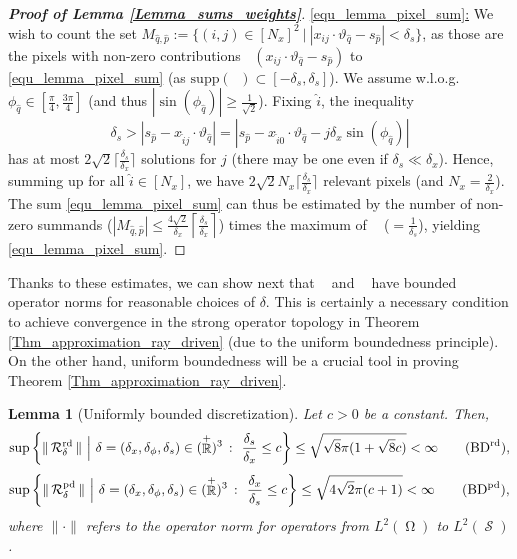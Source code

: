 \documentclass[11pt,reqno]{amsart}
\newcommand{\supp}[1]{\mathrm{supp}\left( #1 \right)}
\DeclareMathOperator{\RR}{\mathbb{R}}
\DeclareMathOperator{\RayRadon}{\mathcal{R}^\mathrm{rd}_{\delta}}
\DeclareMathOperator{\PixelRadon}{\mathcal{R}^\mathrm{pd}_{\delta}}
\DeclareMathOperator{\PixelWeight}{\omega^\mathrm{pd}_{\delta_\mathit{s}}}
\DeclareMathOperator{\imgdom}{\Omega}
\DeclareMathOperator{\sinodom}{\mathcal{S}}
\numberwithin{theorem}{section}
\newtheorem{lemma}[theorem]{Lemma}
\theoremstyle{remark}
\begin{document}
\begin{proof}[\textbf{Proof of Lemma \ref{Lemma_sums_weights}}]
\underline{\eqref{equ_lemma_pixel_sum}:} We wish to count the set $M_{\hat q, \hat p}:=\{(i,j)\in [N_x]^2 \ \big |\ |x_{ij}\cdot \vartheta_{\hat q}-s_{\hat p}|< \delta_s\}$, as those are the  pixels with non-zero contributions $\PixelWeight(x_{ij}\cdot \vartheta_{\hat q}-s_{\hat p})$ to \eqref{equ_lemma_pixel_sum} (as $\supp \PixelWeight \subset [-\delta_s,\delta_s]$).
We assume w.l.o.g. $\phi_{\hat q}\in \left[\frac{\pi}{4},\frac{3\pi}{4}\right]$ (and thus $|\sin(\phi_{\hat q})|\geq \frac {1}{\sqrt{2}}$). Fixing $\hat i$, the inequality 
\begin{equation}
 \delta_{s} > |s_{\hat p} -x_{\hat i j}\cdot \vartheta_{\hat q}|= |s_{\hat p}-x_{\hat i0}\cdot \vartheta_{\hat q}-j \delta_x \sin(\phi_{\hat q})|
 \end{equation}
  has at most $2\sqrt{2} \lceil\frac{\delta_s}{\delta_x}\rceil$ solutions for $j$ (there may be one even if $\delta_s \ll \delta_x$). Hence, summing up for all $\hat i\in [N_x]$, we have  $2\sqrt{2}N_x\lceil\frac{\delta_s}{\delta_x}\rceil$ relevant pixels (and $N_x=\frac{2}{\delta_x}$). The sum \eqref{equ_lemma_pixel_sum} can thus be estimated by the number of non-zero summands ($|M_{\hat q, \hat p}|\leq \frac{4\sqrt{2}}{\delta_x} \left\lceil\frac{\delta_s}{\delta_x}\right\rceil$) times the maximum of $\PixelWeight$ ($=\frac{1}{\delta_s}$), yielding \eqref{equ_lemma_pixel_sum}.
\end{proof}


Thanks to these estimates, we can show next that $\RayRadon$ and $\PixelRadon$ have bounded operator norms for reasonable choices of $\delta$. This is certainly a necessary condition to achieve convergence in the strong operator topology in Theorem \ref{Thm_approximation_ray_driven} (due to the uniform boundedness principle). On the other hand, uniform boundedness will be a crucial tool in proving Theorem \ref{Thm_approximation_ray_driven}.

\begin{lemma}[Uniformly bounded discretization] 
\label{Lemma_bounded_operators}
    Let $c>0$ be a constant. Then,
    \begin{equation} \label{equ_lemma_bounded_ray}
    \sup \left \{\|\RayRadon\| \ \Big | \ \delta=(\delta_x,\delta_\phi,\delta_s)\in (\RR^+)^3 \ \colon \ \frac{\delta_s}{\delta_x}\leq c \right \}   \leq \sqrt{\sqrt{8}\pi(1 +\sqrt{8}c)} <\infty
    \tag{$\mathrm{BD}^\mathrm{rd}$},
    \end{equation}
    \begin{equation}
        \label{equ_lemma_bounded_pixel}
       \sup \left \{\|\PixelRadon\| \ \Big | \ \delta=(\delta_x,\delta_\phi,\delta_s)\in (\RR^+)^3\  \colon \ \frac{\delta_x}{\delta_s}\leq c\right\} \leq \sqrt{4\sqrt{2}\pi (c+1)} <\infty
        \tag{$\mathrm{BD}^\mathrm{pd}$},
    \end{equation}
    where $\|\cdot \|$ refers to the operator norm for operators from $L^2(\imgdom)$ to $L^2(\sinodom)$.
\end{lemma}
\end{document}
